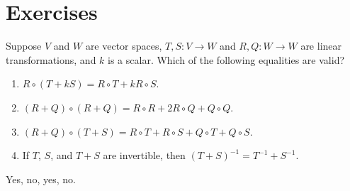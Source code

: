 \section*{Exercises}

\begin{ex}
  Suppose $V$ and $W$ are vector spaces, $T,S:V\to W$ and $R,Q:W\to W$
  are linear transformations, and $k$ is a scalar. Which of the
  following equalities are valid?
  \begin{enumerate}
  \item $R\circ (T+kS) = R\circ T + kR \circ S$.
  \item $(R+Q)\circ (R+Q) = R\circ R + 2R\circ Q + Q\circ Q$.
  \item $(R+Q)\circ (T+S) = R\circ T + R\circ S + Q\circ T + Q\circ S$.
  \item If $T$, $S$, and $T+S$ are invertible, then $(T+S)^{-1} =
    T^{-1} + S^{-1}$.
  \end{enumerate}
  \begin{sol}
    Yes, no, yes, no.
  \end{sol}
\end{ex}

